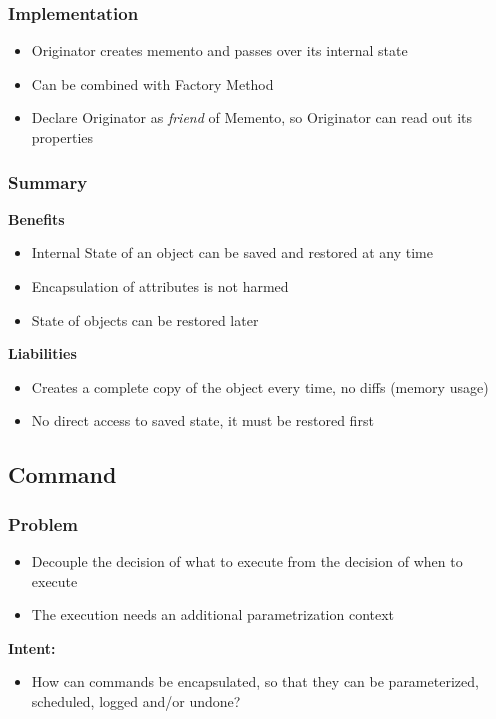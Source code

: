 \subsubsection{Implementation}
\begin{itemize}
    \item Originator creates memento and passes over its internal state
    \item Can be combined with Factory Method
    \item Declare Originator as \textit{friend} of Memento, so Originator can read out its properties
\end{itemize}
\subsubsection{Summary}
\textbf{Benefits}
\begin{itemize}
    \item Internal State of an object can be saved and restored at any time
    \item Encapsulation of attributes is not harmed
    \item State of objects can be restored later
\end{itemize}
\textbf{Liabilities}
\begin{itemize}
    \item Creates a complete copy of the object every time, no diffs (memory usage)
    \item No direct access to saved state, it must be restored first
\end{itemize}


\subsection{Command}
\subsubsection{Problem}
\begin{itemize}
    \item Decouple the decision of what to execute from the decision of when to execute
    \item The execution needs an additional parametrization context
\end{itemize}
\textbf{Intent:}
\begin{itemize}
    \item How can commands be encapsulated, so that they can be parameterized, scheduled, logged and/or undone?
\end{itemize}
